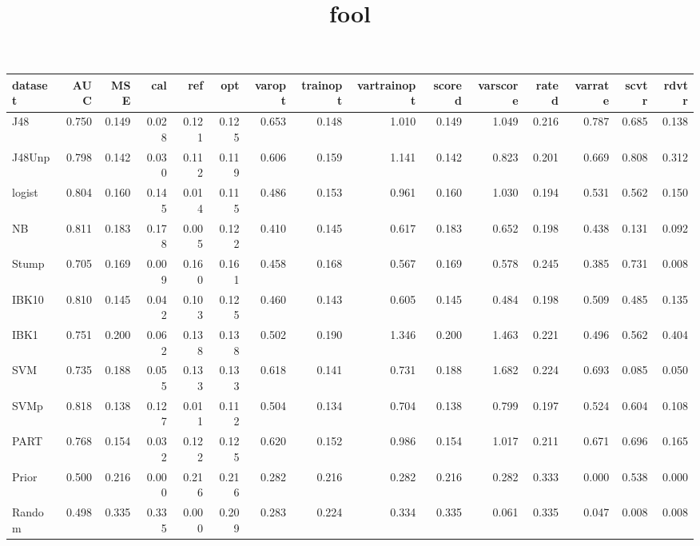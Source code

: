 \documentclass {article}
\begin{document}
 
\title{fool}

 
\tiny

\begin{table}[ht]
\centering
\begingroup\footnotesize
\begin{tabular}{lrrrrrrrrrrrrrr}
  \hline
dataset & AUC & MSE & cal & ref & opt & varopt & trainopt & vartrainopt & scored & varscore & rated & varrate & scvtr & rdvtr \\ 
  \hline
J48 & 0.750 & 0.149 & 0.028 & 0.121 & 0.125 & 0.653 & 0.148 & 1.010 & 0.149 & 1.049 & 0.216 & 0.787 & 0.685 & 0.138 \\ 
  J48Unp & 0.798 & 0.142 & 0.030 & 0.112 & 0.119 & 0.606 & 0.159 & 1.141 & 0.142 & 0.823 & 0.201 & 0.669 & 0.808 & 0.312 \\ 
  logist & 0.804 & 0.160 & 0.145 & 0.014 & 0.115 & 0.486 & 0.153 & 0.961 & 0.160 & 1.030 & 0.194 & 0.531 & 0.562 & 0.150 \\ 
  NB & 0.811 & 0.183 & 0.178 & 0.005 & 0.122 & 0.410 & 0.145 & 0.617 & 0.183 & 0.652 & 0.198 & 0.438 & 0.131 & 0.092 \\ 
  Stump & 0.705 & 0.169 & 0.009 & 0.160 & 0.161 & 0.458 & 0.168 & 0.567 & 0.169 & 0.578 & 0.245 & 0.385 & 0.731 & 0.008 \\ 
  IBK10 & 0.810 & 0.145 & 0.042 & 0.103 & 0.125 & 0.460 & 0.143 & 0.605 & 0.145 & 0.484 & 0.198 & 0.509 & 0.485 & 0.135 \\ 
  IBK1 & 0.751 & 0.200 & 0.062 & 0.138 & 0.138 & 0.502 & 0.190 & 1.346 & 0.200 & 1.463 & 0.221 & 0.496 & 0.562 & 0.404 \\ 
  SVM & 0.735 & 0.188 & 0.055 & 0.133 & 0.133 & 0.618 & 0.141 & 0.731 & 0.188 & 1.682 & 0.224 & 0.693 & 0.085 & 0.050 \\ 
  SVMp & 0.818 & 0.138 & 0.127 & 0.011 & 0.112 & 0.504 & 0.134 & 0.704 & 0.138 & 0.799 & 0.197 & 0.524 & 0.604 & 0.108 \\ 
  PART & 0.768 & 0.154 & 0.032 & 0.122 & 0.125 & 0.620 & 0.152 & 0.986 & 0.154 & 1.017 & 0.211 & 0.671 & 0.696 & 0.165 \\ 
  Prior & 0.500 & 0.216 & 0.000 & 0.216 & 0.216 & 0.282 & 0.216 & 0.282 & 0.216 & 0.282 & 0.333 & 0.000 & 0.538 & 0.000 \\ 
  Random & 0.498 & 0.335 & 0.335 & 0.000 & 0.209 & 0.283 & 0.224 & 0.334 & 0.335 & 0.061 & 0.335 & 0.047 & 0.008 & 0.008 \\ 
   \hline
\end{tabular}
\endgroup
\end{table}
\end{document}
